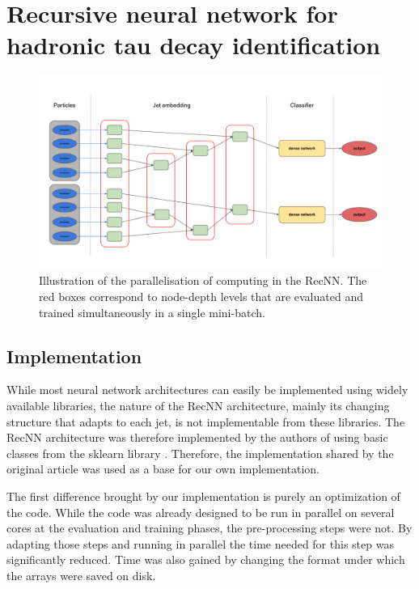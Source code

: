 \section{Recursive neural network for hadronic tau decay identification}


\begin{figure}
    \centering
    \includegraphics[width=\textwidth]{Images/RecNN_diagram_parall1.pdf}
    \caption{Illustration of the parallelisation of computing in the RecNN. The red boxes correspond to node-depth levels that are evaluated and trained simultaneously in a single mini-batch.}
    \label{fig:RecNN_parall}
\end{figure}



\subsection{Implementation}

While most neural network architectures can easily be implemented using widely available libraries, the nature of the RecNN architecture, mainly its changing structure that adapts to each jet, is not implementable from these libraries. The RecNN architecture was therefore implemented by the authors of \cite{Louppe:2017ipp} using basic classes from the sklearn library \cite{scikit-learn}. Therefore, the implementation shared by the original article \cite{Louppe:2017ipp} was used as a base for our own implementation. 

The first difference brought by our implementation is purely an optimization of the code. While the code was already designed to be run in parallel on several cores at the evaluation and training phases, the pre-processing steps were not. By adapting those steps and running in parallel the time needed for this step was significantly reduced. Time was also gained by changing the format under which the arrays were saved on disk.

